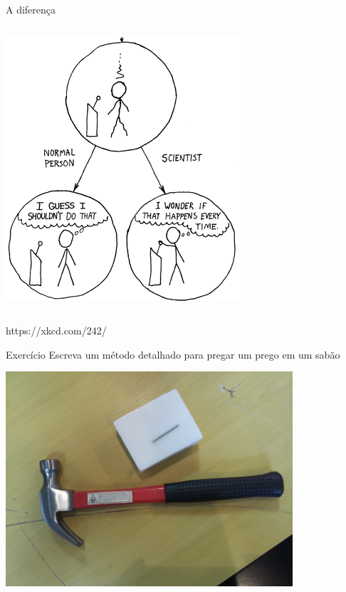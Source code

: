 \documentclass{beamer}
\begin{document}
\begin{frame}{A diferença}
\begin{columns}
\begin{column}{5cm}
\begin{center}
\begin{center}
          \includegraphics[width=\textwidth]{Intro/the_difference2}
        \end{center}
      \end{center}
    \end{column}
  \end{columns}

https://xkcd.com/242/
\end{frame}

\begin{frame}{Exercício}
Escreva um método detalhado para pregar um prego em um sabão

  \begin{center}
    \includegraphics[width=0.8\textwidth]{Intro/pregomartelo}
  \end{center}
\end{frame}
\end{document}
